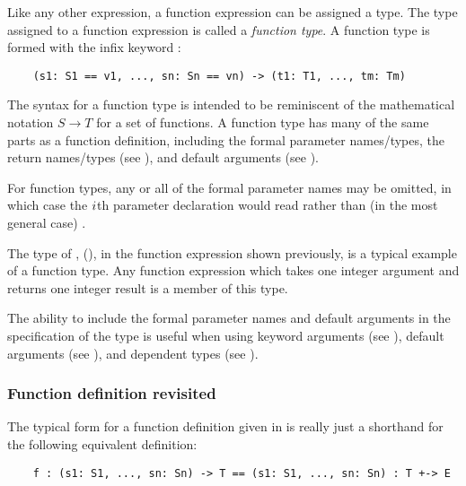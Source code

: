 Like any other expression, a function expression can be assigned a type.
The type assigned to a function expression is called a {\em function type\/}.
A function type is formed with the infix keyword \ttin{->}:

\begin{small}
\begin{verbatim}
    (s1: S1 == v1, ..., sn: Sn == vn) -> (t1: T1, ..., tm: Tm)
\end{verbatim}
\end{small}

The syntax  for a function type is intended to be reminiscent
of the mathematical notation $S \rightarrow T$ for a set of functions.
A function type has many of the same parts as a function definition,
including the formal parameter names/types, the return names/types
(see ), and default arguments 
(see ).

For function types, any or all of the formal parameter names may be omitted,
in which case the $i\/$th parameter declaration would read 
rather than (in the most general case) .

The type of , (), in the function
expression shown previously, is a typical example of a function type.
Any function expression which takes one integer argument and returns
one integer result is a member of this type.

The ability to include the formal parameter names and default arguments
in the specification of the type is useful when using
keyword arguments (see ),
default arguments (see ), and
dependent types (see ).

\subsubsection{Function definition revisited}

The typical form for a function definition given in
 is really just a shorthand
for the following equivalent definition:

\begin{small}
\begin{verbatim}
    f : (s1: S1, ..., sn: Sn) -> T == (s1: S1, ..., sn: Sn) : T +-> E
\end{verbatim}
\end{small}

